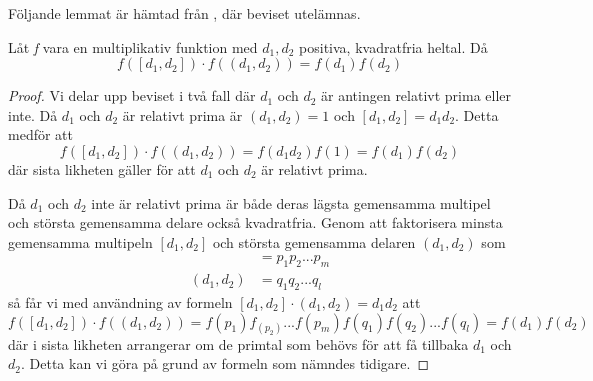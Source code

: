 Följande lemmat är hämtad från \cite[Lemma 7.2.2]{cojocarumurty}, där beviset utelämnas.
\begin{lemma}\label{APDX:multFunk}
Låt \textit{f} vara en multiplikativ funktion med \(d_1,d_2\) positiva, kvadratfria heltal. Då
\begin{equation}
    f([d_1,d_2])\cdot f((d_1, d_2)) = f(d_1)f(d_2)\nonumber
\end{equation}
\end{lemma}
\begin{proof}
Vi delar upp beviset i två fall där \(d_1\) och \(d_2\) är antingen relativt prima eller inte. Då \(d_1\) och \(d_2\) är relativt prima är \((d_1,d_2) = 1\) och \([d_1,d_2] = d_1d_2\). Detta medför att
\begin{equation}
    f([d_1,d_2])\cdot f((d_1, d_2)) = f(d_1d_2)f(1) = f(d_1)f(d_2)\nonumber
\end{equation}
där sista likheten gäller för att  \(d_1\) och \(d_2\) är relativt prima. 

Då  \(d_1\) och \(d_2\) inte är relativt prima är både deras lägsta gemensamma multipel och största gemensamma delare också kvadratfria. Genom att faktorisera minsta gemensamma multipeln \([d_1,d_2]\) och största gemensamma delaren \((d_1,d_2)\) som
\begin{align}
    [d_1,d_2] &= p_1p_2...p_m\nonumber\\
    (d_1,d_2) &= q_1q_2...q_l\nonumber
\end{align}
så får vi med användning av formeln \([d_1,d_2]\cdot(d_1,d_2) = d_1d_2\) att
\begin{equation}
    f([d_1,d_2])\cdot f((d_1, d_2)) = f(p_1)f_(p_2)...f(p_m)f(q_1)f(q_2)...f(q_l) = f(d_1)f(d_2)\nonumber
\end{equation}
där i sista likheten arrangerar om de primtal som behövs för att få tillbaka \(d_1\) och \(d_2\). Detta kan vi göra på grund av formeln som nämndes tidigare.
\end{proof}